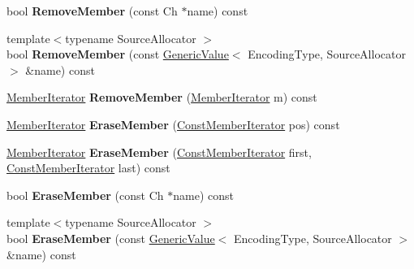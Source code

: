 \begin{DoxyCompactItemize}
\item 
bool {\bfseries Remove\+Member} (const Ch $\ast$name) const \hypertarget{classGenericObject_a64bfcf1671efa5de04cc7659a014a29d}{}\label{classGenericObject_a64bfcf1671efa5de04cc7659a014a29d}

\item 
{\footnotesize template$<$typename Source\+Allocator $>$ }\\bool {\bfseries Remove\+Member} (const \hyperlink{classGenericValue}{Generic\+Value}$<$ Encoding\+Type, Source\+Allocator $>$ \&name) const \hypertarget{classGenericObject_acca9953e3c2e6df16d7685572ac3fe9d}{}\label{classGenericObject_acca9953e3c2e6df16d7685572ac3fe9d}

\item 
\hyperlink{classGenericMemberIterator}{Member\+Iterator} {\bfseries Remove\+Member} (\hyperlink{classGenericMemberIterator}{Member\+Iterator} m) const \hypertarget{classGenericObject_a2489d8522f3c38324df69f6184cd639a}{}\label{classGenericObject_a2489d8522f3c38324df69f6184cd639a}

\item 
\hyperlink{classGenericMemberIterator}{Member\+Iterator} {\bfseries Erase\+Member} (\hyperlink{classGenericMemberIterator}{Const\+Member\+Iterator} pos) const \hypertarget{classGenericObject_a85ed6e1f586c775a02aaa99d0deabcb4}{}\label{classGenericObject_a85ed6e1f586c775a02aaa99d0deabcb4}

\item 
\hyperlink{classGenericMemberIterator}{Member\+Iterator} {\bfseries Erase\+Member} (\hyperlink{classGenericMemberIterator}{Const\+Member\+Iterator} first, \hyperlink{classGenericMemberIterator}{Const\+Member\+Iterator} last) const \hypertarget{classGenericObject_a04c3ce4a9076ab2f7e8f6c5031456c29}{}\label{classGenericObject_a04c3ce4a9076ab2f7e8f6c5031456c29}

\item 
bool {\bfseries Erase\+Member} (const Ch $\ast$name) const \hypertarget{classGenericObject_abcf63f10bbc634620e03bf8b375fa6fd}{}\label{classGenericObject_abcf63f10bbc634620e03bf8b375fa6fd}

\item 
{\footnotesize template$<$typename Source\+Allocator $>$ }\\bool {\bfseries Erase\+Member} (const \hyperlink{classGenericValue}{Generic\+Value}$<$ Encoding\+Type, Source\+Allocator $>$ \&name) const \hypertarget{classGenericObject_afda9d121d16de8b70f7bf09621851218}{}\label{classGenericObject_afda9d121d16de8b70f7bf09621851218}

\end{DoxyCompactItemize}
